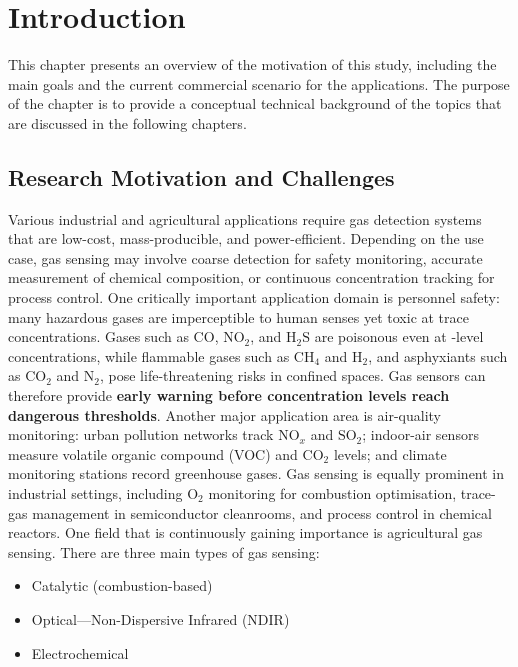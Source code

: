 \section{Introduction}
This chapter presents an overview of the motivation of this study, including
the main goals and the current commercial scenario for the applications. The
purpose of the chapter is to provide a conceptual technical background of the
topics that are discussed in the following chapters.
\pagebreak

\subsection{Research Motivation and Challenges}
Various industrial and agricultural applications require gas detection systems
that are low-cost, mass-producible, and power-efficient. Depending on the use
case, gas sensing may involve coarse detection for safety monitoring, accurate
measurement of chemical composition, or continuous concentration tracking for
process control. One critically important application domain is personnel
safety: many hazardous gases are imperceptible to human senses yet toxic at
trace concentrations. Gases such as $\mathrm{CO}$, $\mathrm{NO}_2$, and
$\mathrm{H}_2\mathrm{S}$ are poisonous even at -level
concentrations, while flammable gases such as $\mathrm{CH}_4$ and
$\mathrm{H}_2$, and asphyxiants such as $\mathrm{CO}_2$ and $\mathrm{N}_2$,
pose life-threatening risks in confined spaces. Gas sensors can therefore
provide \textbf{early warning before concentration levels reach dangerous
thresholds}. Another major application area is air-quality monitoring: urban
pollution networks track $\mathrm{NO}_x$ and $\mathrm{SO}_2$; indoor-air
sensors measure volatile organic compound (VOC) and $\mathrm{CO}_2$ levels;
and climate monitoring stations record greenhouse gases. Gas sensing is equally
prominent in industrial settings, including $\mathrm{O}_2$ monitoring for
combustion optimisation, trace-gas management in semiconductor cleanrooms, and
process control in chemical reactors. One field that is continuously gaining
importance is agricultural gas sensing.
There are three main types of gas sensing:

\begin{itemize}
  \item Catalytic (combustion-based)
  \item Optical---Non-Dispersive Infrared (NDIR)
  \item Electrochemical
\end{itemize}

